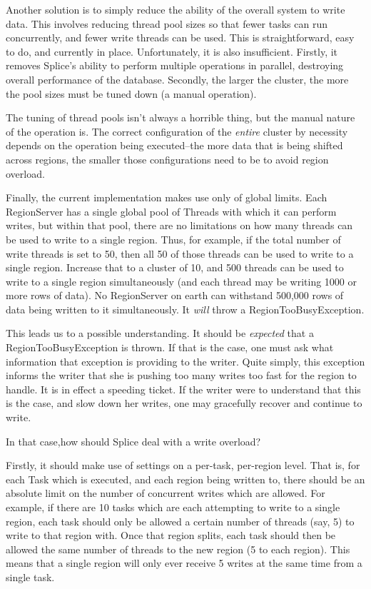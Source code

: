 \documentclass[11pt]{article}
\begin{document}
Another solution is to simply reduce the ability of the overall system to write data. This involves reducing thread pool sizes so that fewer tasks can run
concurrently, and fewer write threads can be used. This is straightforward, easy to do, and currently in place. 
Unfortunately, it is also insufficient. Firstly, it removes Splice's ability to perform multiple operations in parallel, destroying overall 
performance of the database. Secondly, the larger the cluster, the more the pool sizes must be tuned down (a manual operation).

The tuning of thread pools isn't always a horrible thing, but the manual nature of the operation is. The correct configuration of the \emph{entire} cluster
by necessity depends on the operation being executed--the more data that is being shifted across regions, the smaller those configurations need to be to avoid
region overload. 

Finally, the current implementation makes use only of global limits. Each RegionServer has a single global pool of Threads with which it can perform writes, but
within that pool, there are no limitations on how many threads can be used to write to a single region. Thus, for example, if the total number of write threads
is set to 50, then all 50 of those threads can be used to write to a single region. Increase that to a cluster of 10, and 500 threads can be used to write to a
single region simultaneously (and each thread may be writing 1000 or more rows of data). No RegionServer on earth can withstand 500,000 rows of data being
written to it simultaneously. It \emph{will} throw a RegionTooBusyException.

This leads us to a possible understanding. It should be \emph{expected} that a RegionTooBusyException is thrown. If that is the case, one must ask what information
that exception is providing to the writer. Quite simply, this exception informs the writer that she is pushing too many writes too fast for the region to handle. It 
is in effect a speeding ticket. If the writer were to understand that this is the case, and slow down her writes, one may gracefully recover and continue to write.

In that case,how should Splice deal with a write overload? 

Firstly, it should make use of settings on a per-task, per-region level. That is, for each Task which is 
executed, and each region being written to, there should be an absolute limit on the number of concurrent writes which are allowed. For example, if there are
10 tasks which are each attempting to write to a single region, each task should only be allowed a certain number of threads (say, 5) to write to that region
with. Once that region splits, each task should then be allowed the same number of threads to the new region (5 to each region). This means that a single
region will only ever receive 5 writes at the same time from a single task. 
\end{document}
